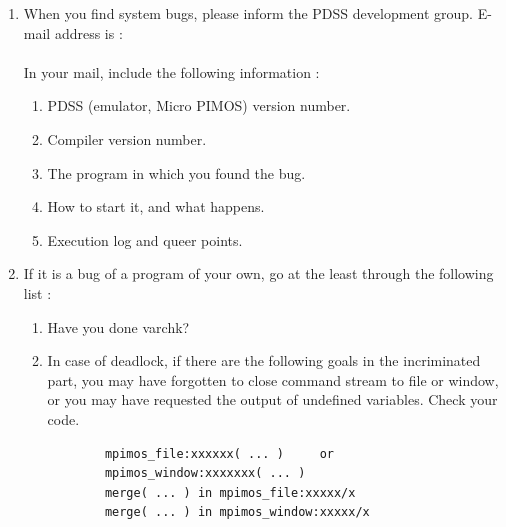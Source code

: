 \newpage
{}
\begin{enumerate}
\item When you find system bugs, please inform the PDSS development group.
E-mail address is :
\vspace{1ex}\\
\hspace*{8em}{\bf pdss@icot21.icot.junet}
\vspace{1ex}\\
In your mail, include the following information :
\begin{enumerate}
\item PDSS (emulator, Micro PIMOS) version number.
\item Compiler version number.
\item The program in which you found the bug.
\item How to start it, and what happens.
\item Execution log and queer points.
\end{enumerate}

\item If it is a bug of a program of your own, go at the least 
through the following list :
\begin{enumerate}

\item Have you done varchk?

\item In case of deadlock, if there are the following goals in the incriminated
part, you may have forgotten to close command stream to file or window, or
you may have requested the output of undefined variables. Check your code.
\begin{verbatim}
        mpimos_file:xxxxxx( ... )     or
        mpimos_window:xxxxxxx( ... )
        merge( ... ) in mpimos_file:xxxxx/x
        merge( ... ) in mpimos_window:xxxxx/x
\end{verbatim}
\end{enumerate}
\end{enumerate}

\NewpageDouble

\printindex


